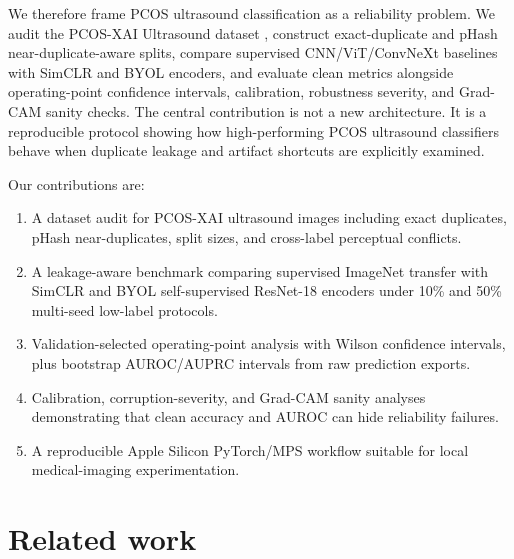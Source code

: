 \documentclass[pdflatex,sn-mathphys-num]{sn-jnl}
\theoremstyle{thmstyleone}
\theoremstyle{thmstyletwo}
\theoremstyle{thmstylethree}
\begin{document}
We therefore frame PCOS ultrasound classification as a reliability problem. We audit the PCOS-XAI Ultrasound dataset \cite{ibadeus_pcos_xai}, construct exact-duplicate and pHash near-duplicate-aware splits, compare supervised CNN/ViT/ConvNeXt baselines with SimCLR and BYOL encoders, and evaluate clean metrics alongside operating-point confidence intervals, calibration, robustness severity, and Grad-CAM sanity checks. The central contribution is not a new architecture. It is a reproducible protocol showing how high-performing PCOS ultrasound classifiers behave when duplicate leakage and artifact shortcuts are explicitly examined.

Our contributions are:
\begin{enumerate}
    \item A dataset audit for PCOS-XAI ultrasound images including exact duplicates, pHash near-duplicates, split sizes, and cross-label perceptual conflicts.
    \item A leakage-aware benchmark comparing supervised ImageNet transfer with SimCLR and BYOL self-supervised ResNet-18 encoders under 10\% and 50\% multi-seed low-label protocols.
    \item Validation-selected operating-point analysis with Wilson confidence intervals, plus bootstrap AUROC/AUPRC intervals from raw prediction exports.
    \item Calibration, corruption-severity, and Grad-CAM sanity analyses demonstrating that clean accuracy and AUROC can hide reliability failures.
    \item A reproducible Apple Silicon PyTorch/MPS workflow suitable for local medical-imaging experimentation.
\end{enumerate}

\section{Related work}\label{sec:related_work}
\end{document}
